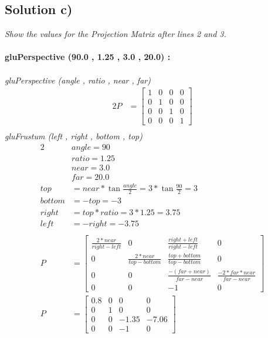 \documentclass[12pt,fleqn,reqno]{article}
\begin{document}
\subsection{Solution c)}
\emph{Show the values for the Projection Matrix after lines 2 and 3.}
\\
\\
\textbf{gluPerspective (90.0 , 1.25 , 3.0 , 20.0) :}\\
\\
\emph{gluPerspective (angle , ratio , near , far)}\\
\begin{alignat*}{2}
	P &=\begin{bmatrix}
		1 & 0 & 0 & 0\\
		0 & 1 & 0 & 0\\
		0 & 0 & 1 & 0\\
		0 & 0 & 0 & 1
	\end{bmatrix}\\
\end{alignat*}
\emph{gluFrustum (left , right , bottom , top)}
\begin{alignat*}{2}
	&angle	= 90\\
	&ratio	= 1.25\\
	&near	= 3.0\\
	&far		=20.0\\
	top		&= near * \tan{\frac{angle}{2}} = 3 *  \tan{\frac{90}{2}} = 3\\
	bottom	&= -top = -3\\
	right		&= top * ratio = 3 * 1.25 = 3.75\\
	left		&= -right	= -3.75\\
	\\
	P &= \begin{bmatrix}
		\frac{2* near}{right-left}	& 0						& \frac{right+left}{right-left} 		& 0\\
		0					& \frac{2*near}{top-bottom}	& \frac{top+bottom}{top-bottom}	& 0\\
		0 					& 0						& \frac{-(far+near)}{far-near}		& \frac{-2*far*near}{far-near}\\
		0					& 0						& -1							& 0
	\end{bmatrix}\\
	P &=\begin{bmatrix}
		0.8 & 0 & 0 & 0\\
		0 & 1 & 0 & 0\\
		0 & 0 & -1.35 & -7.06\\
		0 & 0 & -1 & 0
	\end{bmatrix}\\
\end{alignat*}
\end{document}
